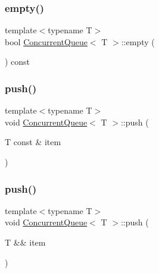 \subsubsection{\texorpdfstring{empty()}{empty()}}
{\footnotesize\ttfamily template$<$typename T$>$ \\
bool \mbox{\hyperlink{classConcurrentQueue}{Concurrent\+Queue}}$<$ T $>$\+::empty (\begin{DoxyParamCaption}{ }\end{DoxyParamCaption}) const\hspace{0.3cm}{\ttfamily [inline]}}

\mbox{\label{classConcurrentQueue_a6ce0d6512df1718fb8c5440a6ab4712b}} 
\subsubsection{\texorpdfstring{push()}{push()}\hspace{0.1cm}{\footnotesize\ttfamily [1/2]}}
{\footnotesize\ttfamily template$<$typename T$>$ \\
void \mbox{\hyperlink{classConcurrentQueue}{Concurrent\+Queue}}$<$ T $>$\+::push (\begin{DoxyParamCaption}\item[{T const \&}]{item }\end{DoxyParamCaption})\hspace{0.3cm}{\ttfamily [inline]}}

\mbox{\label{classConcurrentQueue_a3f75ad8a52994e2654ccc45031446ef5}} 
\subsubsection{\texorpdfstring{push()}{push()}\hspace{0.1cm}{\footnotesize\ttfamily [2/2]}}
{\footnotesize\ttfamily template$<$typename T$>$ \\
void \mbox{\hyperlink{classConcurrentQueue}{Concurrent\+Queue}}$<$ T $>$\+::push (\begin{DoxyParamCaption}\item[{T \&\&}]{item }\end{DoxyParamCaption})\hspace{0.3cm}{\ttfamily [inline]}}

